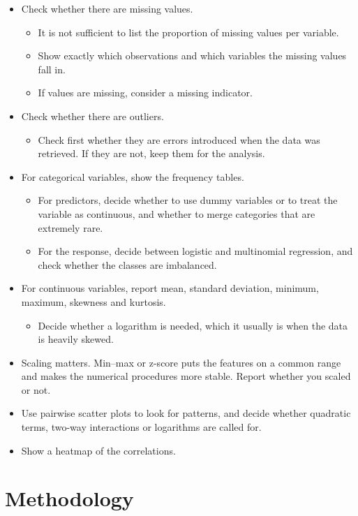 \documentclass[12pt]{article}
\begin{document}
\begin{itemize}
\item Check whether there are missing values.
  \begin{itemize}
  \item It is not sufficient to list the proportion of missing values per variable.
  \item Show exactly which observations and which variables the missing values fall in.
  \item If values are missing, consider a missing indicator.
  \end{itemize}
\item Check whether there are outliers.
  \begin{itemize}
  \item Check first whether they are errors introduced when the data was retrieved.
        If they are not, keep them for the analysis.
  \end{itemize}
\item For categorical variables, show the frequency tables.
  \begin{itemize}
  \item For predictors, decide whether to use dummy variables or to treat the variable
        as continuous, and whether to merge categories that are extremely rare.
  \item For the response, decide between logistic and multinomial regression, and
        check whether the classes are imbalanced.
  \end{itemize}
\item For continuous variables, report mean, standard deviation, minimum, maximum,
      skewness and kurtosis.
  \begin{itemize}
  \item Decide whether a logarithm is needed, which it usually is when the data is
        heavily skewed.
  \end{itemize}
\item Scaling matters. Min--max or z-score puts the features on a common range and
      makes the numerical procedures more stable. Report whether you scaled or not.
\item Use pairwise scatter plots to look for patterns, and decide whether quadratic
      terms, two-way interactions or logarithms are called for.
\item Show a heatmap of the correlations.
\end{itemize}


\section{Methodology}
\end{document}
